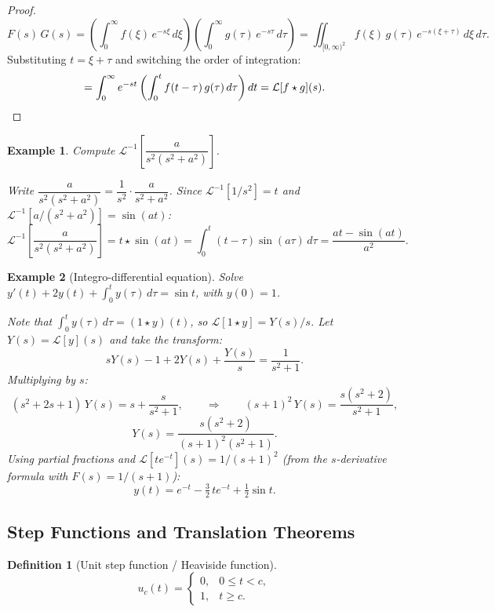 \documentclass{article}
\newtheorem{definition}{Definition}
\newtheorem*{example}{Example}
\newcommand{\Lap}{\mathcal{L}}
\newcommand{\Linv}{\mathcal{L}^{-1}}
\newcommand{\conv}{\star}
\begin{document}
\begin{proof}
    \[F(s)\,G(s) = \left(\int_0^\infty f(\xi)\,e^{-s\xi}\,d\xi\right)\!\left(\int_0^\infty g(\tau)\,e^{-s\tau}\,d\tau\right) = \iint_{[0,\infty)^2} f(\xi)\,g(\tau)\,e^{-s(\xi+\tau)}\,d\xi\,d\tau.\]
    Substituting $t = \xi + \tau$ and switching the order of integration:
    \[= \int_0^\infty e^{-st}\left(\int_0^t f(t-\tau)\,g(\tau)\,d\tau\right)dt = \Lap[f\conv g](s). \qedhere\]
\end{proof}

\begin{example}
    Compute $\Linv\!\left[\dfrac{a}{s^2(s^2+a^2)}\right]$.

    Write $\dfrac{a}{s^2(s^2+a^2)} = \dfrac{1}{s^2}\cdot\dfrac{a}{s^2+a^2}$. Since $\Linv[1/s^2] = t$ and $\Linv[a/(s^2+a^2)] = \sin(at)$:
    \[\Linv\!\left[\frac{a}{s^2(s^2+a^2)}\right] = t\conv\sin(at) = \int_0^t (t-\tau)\sin(a\tau)\,d\tau = \frac{at - \sin(at)}{a^2}.\]
\end{example}

\begin{example}[Integro-differential equation]
    Solve $y'(t) + 2y(t) + \displaystyle\int_0^t y(\tau)\,d\tau = \sin t$, with $y(0) = 1$.

    Note that $\int_0^t y(\tau)\,d\tau = (1\conv y)(t)$, so $\Lap[1\conv y] = Y(s)/s$. Let $Y(s) = \Lap[y](s)$ and take the transform:
    \[sY(s) - 1 + 2Y(s) + \frac{Y(s)}{s} = \frac{1}{s^2+1}.\]
    Multiplying by $s$:
    \[(s^2 + 2s + 1)\,Y(s) = s + \frac{s}{s^2+1}, \qquad\Longrightarrow\qquad (s+1)^2\,Y(s) = \frac{s(s^2+2)}{s^2+1},\]
    \[Y(s) = \frac{s(s^2+2)}{(s+1)^2(s^2+1)}.\]
    Using partial fractions and $\Lap[te^{-t}](s) = 1/(s+1)^2$ (from the $s$-derivative formula with $F(s) = 1/(s+1)$):
    \[\boxed{y(t) = e^{-t} - \tfrac{3}{2}\,te^{-t} + \tfrac{1}{2}\sin t.}\]
\end{example}

\subsection{Step Functions and Translation Theorems}

\begin{definition}[Unit step function / Heaviside function]
    \[u_c(t) = \begin{cases}0, & 0 \leq t < c,\\ 1, & t \geq c.\end{cases}\]
\end{definition}
\end{document}
